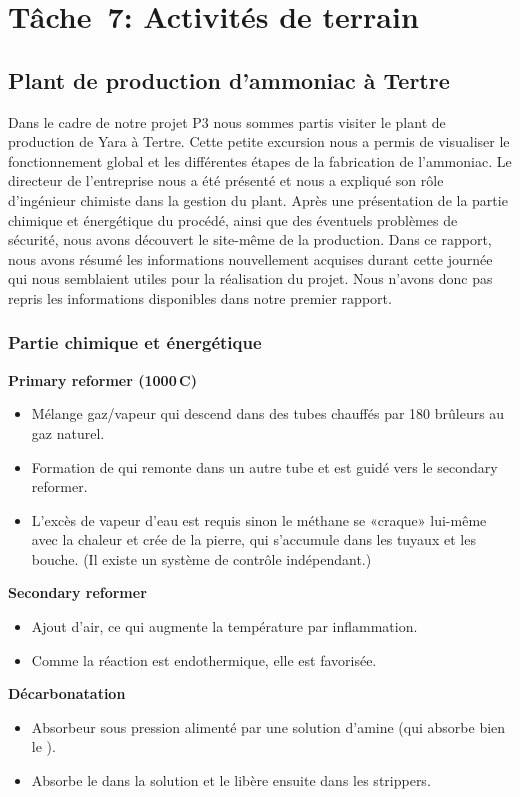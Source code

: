 \chapter{Tâche~7: Activités de terrain}

\section{Plant de production d'ammoniac à Tertre}
Dans le cadre de notre projet P3 nous sommes partis visiter le plant de production de Yara à Tertre. Cette petite excursion nous a permis de visualiser le fonctionnement global et les différentes étapes de la fabrication de l'ammoniac. Le directeur de l'entreprise nous a été présenté et nous a expliqué son rôle d'ingénieur chimiste dans la gestion du plant. Après une présentation de la partie chimique et énergétique du procédé, ainsi que des éventuels problèmes de sécurité, nous avons découvert le site-même de la production. Dans ce rapport, nous avons résumé les informations nouvellement acquises durant cette journée qui nous semblaient utiles pour la réalisation du projet. Nous n'avons donc pas repris les informations disponibles dans notre premier rapport.
\subsection{Partie chimique et énergétique}
\textbf{Primary reformer (1000\,\degree C)}
\begin{itemize}
\item Mélange gaz/vapeur qui descend dans des tubes chauffés par 180 brûleurs au gaz naturel.
\item Formation de  qui remonte dans un autre tube et est guidé vers le secondary reformer.
\item L'excès de vapeur d'eau est requis sinon le méthane se «craque» lui-même avec la chaleur et crée de la pierre, qui s'accumule dans les tuyaux et les bouche. (Il existe un système de contrôle indépendant.)
\end{itemize}

\textbf{Secondary reformer }
\begin{itemize}
\item Ajout d'air, ce qui augmente la température par inflammation.
\item Comme la réaction est endothermique, elle est favorisée.
\end{itemize}

\textbf{Décarbonatation}
\begin{itemize}
\item Absorbeur sous pression alimenté par une solution d'amine (qui absorbe bien le ).
\item Absorbe le  dans la solution et le libère ensuite dans les strippers.
\end{itemize}

